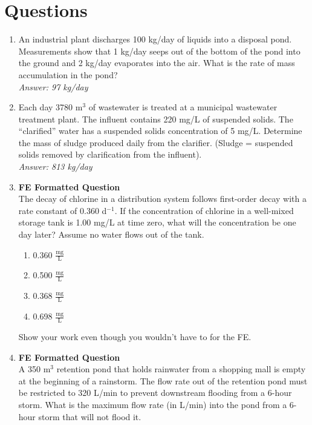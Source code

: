 \documentclass[12pt,letterpaper]{article}
\begin{document}
\section *{Questions}
\begin{enumerate}
\item An industrial plant discharges 100 kg/day of liquids into a disposal pond.  Measurements show that 1 kg/day seeps out of the bottom of the pond into the ground and 2 kg/day evaporates into the air.  What is the rate of mass accumulation in the pond?\\
\emph{Answer: 97 kg/day} 

\item 	Each day 3780 m$^3$ of wastewater is treated at a municipal wastewater treatment plant.  The influent contains 220 mg/L of suspended solids.  The “clarified” water has a suspended solids concentration of 5 mg/L.  Determine the mass of sludge produced daily from the clarifier. (Sludge = suspended solids removed by clarification from the influent).
\\
\emph{Answer: 813 kg/day}  

\item \textbf{FE Formatted Question}\\
The decay of chlorine in a distribution system follows first-order decay with a rate constant of 0.360 d$^{-1}$.  If the concentration of chlorine in a well-mixed storage tank is 1.00 mg/L at time zero, what will the concentration be one day later? Assume no water flows out of the tank.

\begin{enumerate}
\item 0.360 $\mathrm{\frac{mg}{L}}$
\item 0.500 $\mathrm{\frac{mg}{L}}$
\item 0.368 $\mathrm{\frac{mg}{L}}$
\item 0.698 $\mathrm{\frac{mg}{L}}$
\end{enumerate}
Show your work even though you wouldn't have to for the FE.

\item \textbf{FE Formatted Question}\\
A 350 $\mathrm{m^3}$ retention pond that holds rainwater from a shopping mall is empty at the beginning of a rainstorm.  The flow rate out of the retention pond must be restricted to 320 L/min to prevent downstream flooding from a 6-hour storm.  What is the maximum flow rate (in L/min) into the pond from a 6-hour storm that will not flood it.


\end{enumerate}
\end{document}
